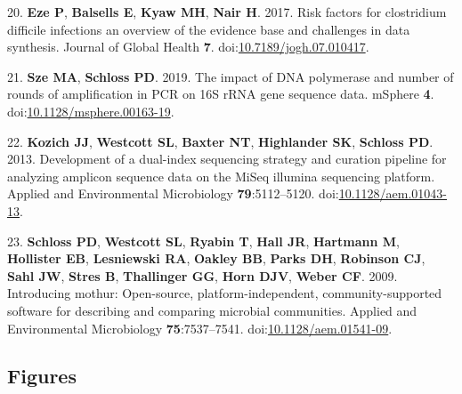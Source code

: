 \documentclass[11pt,]{article}
\begin{document}
\hypertarget{ref-Eze2017}{}
20. \textbf{Eze P}, \textbf{Balsells E}, \textbf{Kyaw MH}, \textbf{Nair
H}. 2017. Risk factors for clostridium difficile infections an overview
of the evidence base and challenges in data synthesis. Journal of Global
Health \textbf{7}.
doi:\href{https://doi.org/10.7189/jogh.07.010417}{10.7189/jogh.07.010417}.

\hypertarget{ref-Sze2019}{}
21. \textbf{Sze MA}, \textbf{Schloss PD}. 2019. The impact of DNA
polymerase and number of rounds of amplification in PCR on 16S rRNA gene
sequence data. mSphere \textbf{4}.
doi:\href{https://doi.org/10.1128/msphere.00163-19}{10.1128/msphere.00163-19}.

\hypertarget{ref-Kozich2013}{}
22. \textbf{Kozich JJ}, \textbf{Westcott SL}, \textbf{Baxter NT},
\textbf{Highlander SK}, \textbf{Schloss PD}. 2013. Development of a
dual-index sequencing strategy and curation pipeline for analyzing
amplicon sequence data on the MiSeq illumina sequencing platform.
Applied and Environmental Microbiology \textbf{79}:5112--5120.
doi:\href{https://doi.org/10.1128/aem.01043-13}{10.1128/aem.01043-13}.

\hypertarget{ref-Schloss2009}{}
23. \textbf{Schloss PD}, \textbf{Westcott SL}, \textbf{Ryabin T},
\textbf{Hall JR}, \textbf{Hartmann M}, \textbf{Hollister EB},
\textbf{Lesniewski RA}, \textbf{Oakley BB}, \textbf{Parks DH},
\textbf{Robinson CJ}, \textbf{Sahl JW}, \textbf{Stres B},
\textbf{Thallinger GG}, \textbf{Horn DJV}, \textbf{Weber CF}. 2009.
Introducing mothur: Open-source, platform-independent,
community-supported software for describing and comparing microbial
communities. Applied and Environmental Microbiology
\textbf{75}:7537--7541.
doi:\href{https://doi.org/10.1128/aem.01541-09}{10.1128/aem.01541-09}.

\newpage

\subsection{Figures}\label{figures}
\end{document}
